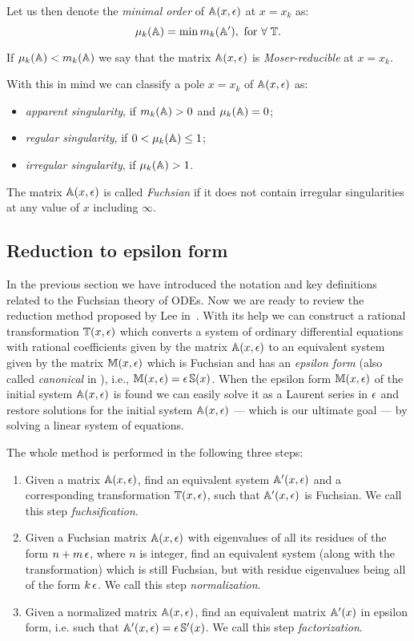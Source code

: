 \documentclass[12pt,a4paper]{article}
\begin{document}
Let us then denote the {\em minimal order} of $\mathbb{A}(x,\epsilon)$ at $x=x_k$ as:
\begin{equation}
\label{eq:muk}
  \mu_k(\mathbb{A}) = \min m_k(\mathbb{A}'), \text{ for } \forall \; \mathbb{T}.
\end{equation}

If $\mu_k(\mathbb{A}) < m_k(\mathbb{A})$ we say that the matrix $\mathbb{A}(x,\epsilon)$ is {\em Moser-reducible} at $x=x_k$.

With this in mind we can classify a pole $x=x_k$ of $\mathbb{A}(x,\epsilon)$ as:
\begin{itemize}
  \item {\em apparent singularity}, if $m_k(\mathbb{A}) > 0$ and $\mu_k(\mathbb{A}) = 0$;
  \item {\em regular singularity}, if $0 < \mu_k(\mathbb{A}) \le 1$;
  \item {\em irregular singularity}, if $\mu_k(\mathbb{A}) > 1$.
\end{itemize}
The matrix $\mathbb{A}(x,\epsilon)$ is called {\em Fuchsian} if it does not contain irregular singularities at any value of $x$ including $\infty$.


\subsection{Reduction to epsilon form}

In the previous section we have introduced the notation and key definitions related to the Fuchsian theory of ODEs.
Now we are ready to review the reduction method proposed by Lee in~\cite{Lee15}.
With its help we can construct a rational transformation $\mathbb{T}(x,\epsilon)$ which converts a system of ordinary differential equations with rational coefficients given by the matrix $\mathbb{A}(x,\epsilon)$ to an equivalent system given by the matrix $\mathbb{M}(x,\epsilon)$ which is Fuchsian and has an \textit{epsilon form} (also called {\em canonical} in \cite{Henn13}), i.e., $\mathbb{M}(x,\epsilon) = \epsilon\, \mathbb{S}(x)$.
When the epsilon form $\mathbb{M}(x,\epsilon)$ of the initial system $\mathbb{A}(x,\epsilon)$ is found we can easily solve it as a Laurent series in $\epsilon$ and restore solutions for the initial system $\mathbb{A}(x,\epsilon)$ --- which is our ultimate goal --- by solving a linear system of equations.

The whole method is performed in the following three steps:

\begin{enumerate}
    \item Given a matrix $\mathbb{A}(x,\epsilon)$, find an equivalent system $\mathbb{A}'(x,\epsilon)$ and a corresponding transformation $\mathbb{T}(x,\epsilon)$, such that $\mathbb{A}'(x,\epsilon)$ is Fuchsian. We call this step \textit{fuchsification}.
    \item Given a Fuchsian matrix $\mathbb{A}(x,\epsilon)$ with eigenvalues of all its residues of the form $n+m\,\epsilon$, where $n$ is integer, find an equivalent system (along with the transformation) which is still Fuchsian, but with residue eigenvalues being all of the form $k\,\epsilon$. We call this step \textit{normalization}.
    \item Given a normalized matrix $\mathbb{A}(x,\epsilon)$, find an equivalent matrix $\mathbb{A}'(x)$ in epsilon form, i.e. such that $\mathbb{A}'(x,\epsilon) = \epsilon \, \mathbb{S}'(x)$. We call this step \textit{factorization}.
\end{enumerate}
\end{document}
